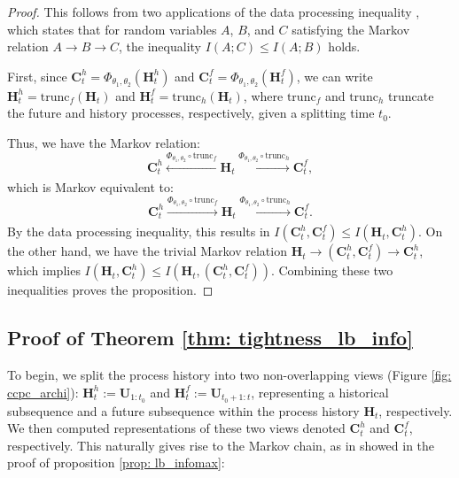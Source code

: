 \documentclass{article}
\theoremstyle{plain}
\theoremstyle{definition}
\theoremstyle{remark}
\begin{document}
\begin{proof}
This follows from two applications of the data processing inequality \cite{cover1999elementsInfo}, which states that for random variables \( A \), \( B \), and \( C \) satisfying the Markov relation \( A \rightarrow B \rightarrow C \), the inequality \( I(A;C) \leq I(A;B) \) holds.

First, since \( \mathbf{C}_t^h = \Phi_{\theta_{1},\theta_{2}}(\mathbf{H}_t^h) \) and \( \mathbf{C}_t^f = \Phi_{\theta_{1},\theta_{2}}(\mathbf{H}_t^f) \), we can write \( \mathbf{H}_t^h = \mathrm{trunc}_f(\mathbf{H}_t) \) and \( \mathbf{H}_t^f = \mathrm{trunc}_h(\mathbf{H}_t) \), where \( \mathrm{trunc}_f \) and \( \mathrm{trunc}_h \) truncate the future and history processes, respectively, given a splitting time \( t_0 \).

Thus, we have the Markov relation:
\[
\mathbf{C}_t^h \xleftarrow{\Phi_{\theta_{1},\theta_{2}} \circ \mathrm{trunc}_f} \mathbf{H}_t \xrightarrow[]{\Phi_{\theta_{1},\theta_{2}} \circ \mathrm{trunc}_h} \mathbf{C}_t^f,
\]
which is Markov equivalent to:
\[
\mathbf{C}_t^h \xrightarrow{\Phi_{\theta_{1},\theta_{2}} \circ \mathrm{trunc}_f} \mathbf{H}_t \xrightarrow[]{\Phi_{\theta_{1},\theta_{2}} \circ \mathrm{trunc}_h} \mathbf{C}_t^f.
\]
By the data processing inequality, this results in \( I(\mathbf{C}_t^h, \mathbf{C}_t^f) \leq I(\mathbf{H}_t, \mathbf{C}_t^h) \). On the other hand, we have the trivial Markov relation \( \mathbf{H}_t \rightarrow (\mathbf{C}_t^h, \mathbf{C}_t^f) \rightarrow \mathbf{C}_t^h \), which implies \( I(\mathbf{H}_t, \mathbf{C}_t^h) \leq I(\mathbf{H}_t, (\mathbf{C}_t^h, \mathbf{C}_t^f)) \). Combining these two inequalities proves the proposition.
\end{proof}

\subsection{Proof of Theorem \ref{thm: tightness_lb_info}}

To begin, we split the process history into two non-overlapping views (Figure \ref{fig: ccpc_archi}): $\mathbf{H}_t^h := \mathbf{U}_{1:t_0}$ and $\mathbf{H}_t^f := \mathbf{U}_{t_0+1:t}$, representing a historical subsequence and a future subsequence within the process history $\mathbf{H}_{t}$, respectively. We then computed representations of these two views denoted $\mathbf{C}_t^h$ and $\mathbf{C}_t^f$, respectively. This naturally gives rise to the Markov chain, as in showed in the proof of proposition \ref{prop: lb_infomax}:
\end{document}
